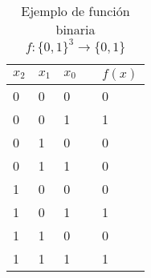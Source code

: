 \begin{table}[H]
\centering
\begin{tabular}{lllll}
$x_2$ & $x_1$ & $x_0$ & & $f(x)$ \\ \hline
0&0&0 &&0\\
0&0&1 &&1\\
0&1&0 &&0\\
0&1&1 &&0\\
1&0&0 &&0\\
1&0&1 &&1\\
1&1&0 &&0\\
1&1&1 &&1\\ \hline
\end{tabular}
\caption{Ejemplo de función binaria $f: \{0, 1\}^3 \rightarrow \{0, 1\}$}
\label{Tab_InitialOracle_f_bin_1}
\end{table}
